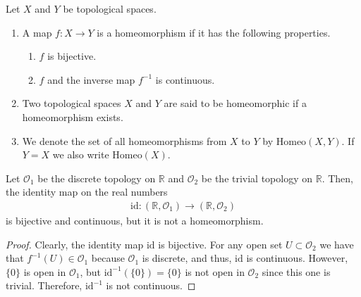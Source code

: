 \begin{defbox}
    \begin{definition}[Homeomorphism]
        Let \(X\) and \(Y\) be {\color{mathif}topological spaces}.
        \begin{enumerate}
            \item A {\color{mathobj}map} \(f: X \longrightarrow Y\) is a {\color{maththen}homeomorphism} if it has the following properties.

            \begin{enumerate}
                \item \(f\) is {\color{mathif}bijective}.
                \item \(f\) and the {\color{mathif}inverse map} \(f^{-1}\) is {\color{mathif}continuous}.
            \end{enumerate}

            \item Two topological spaces \(X\) and \(Y\) are said to be {\color{maththen}homeomorphic} if a homeomorphism exists.

            \item We denote the set of all homeomorphisms from \(X\) to \(Y\) by \(\mathrm{Homeo}(X, Y)\). If \(Y = X\) we also write \(\mathrm{Homeo}(X)\).
        \end{enumerate}
    \end{definition}
\end{defbox}
%
\begin{exmbox}
    \begin{example}
        Let \(\mathcal{O}_1\) be the discrete topology on \(\mathbb{R}\) and \(\mathcal{O}_2\) be the trivial topology on \(\mathbb{R}\). Then, the identity map on the real numbers
        \begin{align*}
            \mathrm{id}: (\mathbb{R}, \mathcal{O}_1) \longrightarrow (\mathbb{R}, \mathcal{O}_2)
        \end{align*}
        is bijective and continuous, but it is not a homeomorphism.
    \end{example}
\end{exmbox}
%
\begin{proof}
    Clearly, the identity map \(\mathrm{id}\) is bijective. For any open set \(U \subset \mathcal{O}_2\) we have that \(f^{-1}(U) \in \mathcal{O}_1\) because \(\mathcal{O}_1\) is discrete, and thus, \(\mathrm{id}\) is continuous. However, \(\{0\}\) is open in \(\mathcal{O}_1\), but \(\mathrm{id}^{-1}(\{0\}) = \{0\}\) is not open in \(\mathcal{O}_2\) since this one is trivial. Therefore, \(\mathrm{id}^{-1}\) is not continuous.
\end{proof}
%

